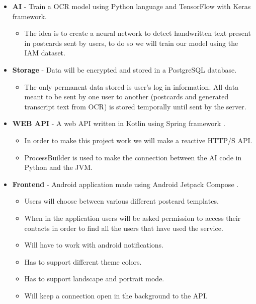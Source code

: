 \documentclass[11pt,a4paper]{article}
\begin{document}
	\begin{itemize}
		\item \textbf{AI} - Train a OCR \cite{IBM2023} model using Python language \cite{Python2023} and TensorFlow with Keras \cite{Tensorflow2023} framework. 
		\begin{itemize}
			\item The idea is to create a neural network to detect handwritten text present in postcards sent by users, to do so we will train our model using the IAM \cite{IAM2023} dataset. 
		\end{itemize}
		\item \textbf{Storage} - Data will be encrypted and stored in a PostgreSQL \cite{Postgres2023} database.
		\begin{itemize}
			\item The only permanent data stored is user's log in information. All data meant to be sent by one user to another (postcards and generated transcript text from OCR) is stored temporally until sent by the server. 
		\end{itemize}
		\item \textbf{WEB API} - A web API written in Kotlin \cite{Kotlin2023} using Spring framework \cite{Spring2023}.
		\begin{itemize}
			\item In order to make this project work we will make a reactive HTTP/S API.
			\item ProcessBuilder is used to make the connection between the AI code in Python and the JVM.
		\end{itemize}
		\item \textbf{Frontend} - Android application made using Android Jetpack Compose \cite{Compose2023}.
		\begin{itemize}
			\item Users will choose between various different postcard templates.  
			\item When in the application users will be asked permission to access their contacts in order to find all the users that have used the service.
			\item Will have to work with android notifications.
			\item Has to support different theme colors.
			\item Has to support landscape and portrait mode.
			\item Will keep a connection open in the background to the API.
		\end{itemize}
	\end{itemize}
\end{document}
